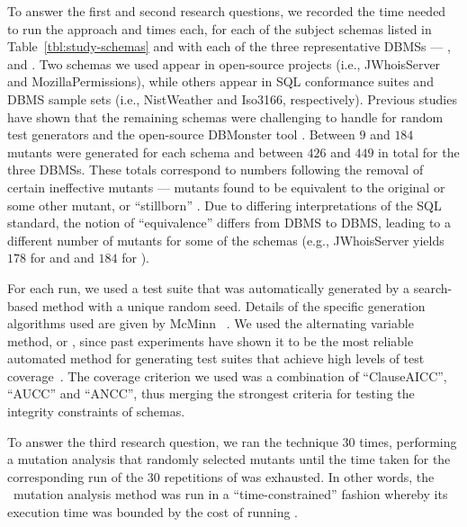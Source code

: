 \begin{sloppypar}
 To answer the first and second research \mbox{questions}, we recorded the time needed to run the \Original approach and  times each, for each of the subject schemas listed in Table~\ref{tbl:study-schemas} and with each of the three representative DBMSs --- \HyperSQL, \Postgres and \SQLite.  Two schemas we used appear in open-source projects (i.e., JWhoisServer and MozillaPermissions), while others appear in SQL conformance suites and DBMS sample sets (i.e., NistWeather and Iso3166, respectively). Previous studies have shown that the remaining schemas were challenging to handle for random test generators \cite{McMinn2015} and the open-source DBMonster tool \cite{Kapfhammer2013}.  Between $9$ and $184$ mutants were generated for each schema and between $426$ and $449$ in total for the three DBMSs. These totals correspond to numbers following the removal of certain ineffective mutants --- mutants found to be equivalent to the original or some other mutant, or ``stillborn'' \cite{Wright2014}. Due to differing interpretations of the SQL standard, the notion of ``equivalence'' differs from DBMS to DBMS, leading to a different number of mutants for some of the schemas (e.g., JWhoisServer yields $178$ for \HyperSQL and \Postgres and $184$ for \SQLite).
\end{sloppypar}


For each run, we used a test suite that was automatically generated by a search-based method with a unique random seed.  Details of the specific generation algorithms used are given by McMinn \etal~\cite{McMinn2015}. We used the alternating variable method, or \AVM, since past experiments have shown it to be the most reliable automated method for generating test suites that achieve high levels of test coverage~\cite{McMinn2015}. The coverage criterion we used was a combination of ``ClauseAICC'', ``AUCC'' and ``ANCC'', thus merging the strongest criteria for testing the integrity constraints of schemas.


To answer the third research question, we ran the \Original technique $30$ times, performing a mutation analysis that randomly selected mutants until the time taken for the corresponding run of the $30$ repetitions of \vma was exhausted.
%
%
In other words, the \Original~mutation analysis method was run in a ``time-constrained'' fashion whereby its execution time was bounded by the cost of running \vma.


